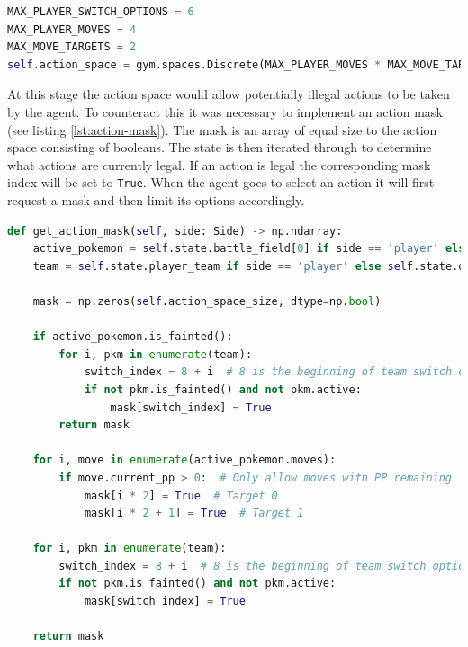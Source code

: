 \begin{lstlisting}[basicstyle=\fontsize{10}{10}\selectfont\ttfamily,language=Python,caption={The defined action space.},label=lst:action-space-def,breaklines]
MAX_PLAYER_SWITCH_OPTIONS = 6
MAX_PLAYER_MOVES = 4
MAX_MOVE_TARGETS = 2
self.action_space = gym.spaces.Discrete(MAX_PLAYER_MOVES * MAX_MOVE_TARGETS + MAX_PLAYER_SWITCH_OPTIONS)
\end{lstlisting}

At this stage the action space would allow potentially illegal actions to be taken by the agent. To counteract this it was
necessary to implement an action mask (see listing \ref{lst:action-mask}). The mask is an array of equal size to the action space
consisting of booleans. The state is then iterated through to determine what actions are currently legal. If an action is legal
the corresponding mask index will be set to \lstinline|True|. When the agent goes to select an action it will first request
a mask and then limit its options accordingly.

\begin{lstlisting}[basicstyle=\fontsize{10}{10}\selectfont\ttfamily,language=Python,caption={The action mask that makes sure only valid actions are being evaluated.},label=lst:action-mask,breaklines]
def get_action_mask(self, side: Side) -> np.ndarray:
    active_pokemon = self.state.battle_field[0] if side == 'player' else self.state.battle_field[1]
    team = self.state.player_team if side == 'player' else self.state.opponent_team

    mask = np.zeros(self.action_space_size, dtype=np.bool)

    if active_pokemon.is_fainted():
        for i, pkm in enumerate(team):
            switch_index = 8 + i  # 8 is the beginning of team switch options
            if not pkm.is_fainted() and not pkm.active:
                mask[switch_index] = True
        return mask

    for i, move in enumerate(active_pokemon.moves):
        if move.current_pp > 0:  # Only allow moves with PP remaining
            mask[i * 2] = True  # Target 0
            mask[i * 2 + 1] = True  # Target 1

    for i, pkm in enumerate(team):
        switch_index = 8 + i  # 8 is the beginning of team switch options
        if not pkm.is_fainted() and not pkm.active:
            mask[switch_index] = True

    return mask
\end{lstlisting}


